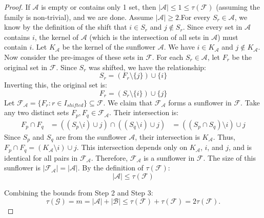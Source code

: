 \documentclass[runningheads,12pt,a4paper]{article}
\begin{document}
\begin{proof}
	If $\mathcal{A}$ is empty or contains only 1 set, then $|\mathcal{A}| \le 1 \le \tau(\mathcal{F})$ (assuming the family is non-trivial), and we are done. Assume $|\mathcal{A}| \ge 2$.For every $S_r \in \mathcal{A}$, we know by the definition of the shift that $i \in S_r$ and $j \notin S_r$. Since every set in $\mathcal{A}$ contains $i$, the kernel of $\mathcal{A}$ (which is the intersection of all sets in $\mathcal{A}$) must contain $i$. Let $K_{\mathcal{A}}$ be the kernel of the sunflower $\mathcal{A}$. We have $i \in K_{\mathcal{A}}$ and $j \notin K_{\mathcal{A}}$. Now consider the pre-images of these sets in $\mathcal{F}$. For each $S_r \in \mathcal{A}$, let $F_r$ be the original set in $\mathcal{F}$. Since $S_r$ was shifted, we have the relationship:$$S_r = (F_r \setminus \{j\}) \cup \{i\}$$
	Inverting this, the original set is:$$F_r = (S_r \setminus \{i\}) \cup \{j\}$$
	Let $\mathcal{F}_{\mathcal{A}} = \{ F_r : r \in I_{shifted} \} \subseteq \mathcal{F}$. We claim that $\mathcal{F}_{\mathcal{A}}$ forms a sunflower in $\mathcal{F}$. Take any two distinct sets $F_p, F_q \in \mathcal{F}_{\mathcal{A}}$. Their intersection is:\begin{align*}F_p \cap F_q &= \left( (S_p \setminus {i}) \cup {j} \right) \cap \left( (S_q \setminus {i}) \cup {j} \right) &= \left( (S_p \cap S_q) \setminus {i} \right) \cup {j}
	\end{align*}
	Since $S_p$ and $S_q$ are from the sunflower $\mathcal{A}$, their intersection is $K_{\mathcal{A}}$.
	Thus, $F_p \cap F_q = (K_{\mathcal{A}} \setminus {i}) \cup {j}$. This intersection depends only on $K_{\mathcal{A}}$, $i$, and $j$, and is identical for all pairs in $\mathcal{F}_{\mathcal{A}}$. Therefore, $\mathcal{F}_{\mathcal{A}}$ is a sunflower in $\mathcal{F}$. The size of this sunflower is $|\mathcal{F}_{\mathcal{A}}| = |\mathcal{A}|$. By the definition of $\tau(\mathcal{F})$:$$|\mathcal{A}| \leq \tau(\mathcal{F})$$
	
	Combining the bounds from Step 2 and Step 3:\[\tau(\mathcal{G}) = m = |\mathcal{A}| + |\mathcal{B}| \leq \tau(\mathcal{F}) + \tau(\mathcal{F})= 2\tau(\mathcal{F}).\]
\end{proof}
\end{document}

